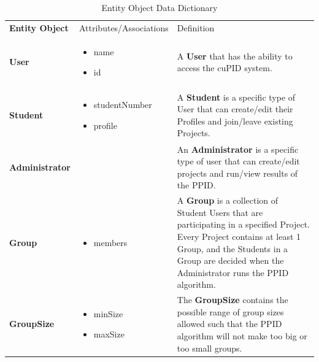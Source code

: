 \documentclass[12pt,letterpaper]{article}
\begin{document}
\begin{table}[H]
	\caption{Entity Object Data Dictionary}
	\begin{tabu} to 
		\tableheader{}Entity Object & Attributes/\newline Associations & Definition\\
		User & 
		\begin{minipage}[t]{\linewidth}
			\begin{itemize}
				\item name
				\item id
			\end{itemize}
		\end{minipage} & 
		A \textbf{User} that has the ability to access the cuPID system.\\
		
		Student & 
		\begin{minipage}[t]{\linewidth}
			\begin{itemize}
				\item studentNumber
				\item profile
			\end{itemize}
		\end{minipage} & 
		A \textbf{Student} is a specific type of User that can create/edit their Profiles and join/leave existing Projects.\\
		
		Administrator & 
		&
		An \textbf{Administrator} is a specific type of user that can create/edit projects and run/view results of the PPID.\\

		Group & 
		\begin{minipage}[t]{\linewidth}
			\begin{itemize}
				\item members
			\end{itemize}
		\end{minipage} & 
		A \textbf{Group} is a collection of Student Users that are participating in a specified Project. Every Project contains at least 1 Group, and the Students in a Group are decided when the Administrator runs the PPID algorithm.\\

		GroupSize & 
		\begin{minipage}[t]{\linewidth}
			\begin{itemize}
				\item minSize
				\item maxSize
			\end{itemize}
		\end{minipage} & 
		The \textbf{GroupSize} contains the possible range of group sizes allowed such that the PPID algorithm will not make too big or too small groups.\\


\end{tabu}
\end{table}
\end{document}
